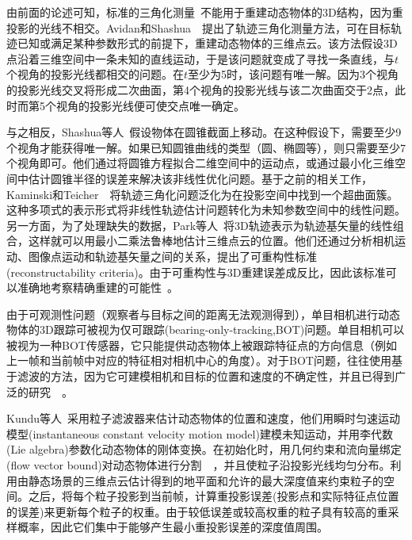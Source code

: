 由前面的论述可知，标准的三角化测量~\cite{hartley1997triangulation}不能用于重建动态物体的3D结构，因为重投影的光线不相交。Avidan和Shashua~\cite{avidan1999trajectory}~\cite{avidan2000trajectory}提出了轨迹三角化测量方法，可在目标轨迹已知或满足某种参数形式的前提下，重建动态物体的三维点云。该方法假设3D点沿着三维空间中一条未知的直线运动，于是该问题就变成了寻找一条直线，与$t$个视角的投影光线都相交的问题。在$t$至少为5时，该问题有唯一解。因为3个视角的投影光线交叉将形成二次曲面，第4个视角的投影光线与该二次曲面交于2点，此时而第5个视角的投影光线便可使交点唯一确定。

与之相反，Shashua等人~\cite{shashua1999trajectory}假设物体在圆锥截面上移动。在这种假设下，需要至少9个视角才能获得唯一解。如果已知圆锥曲线的类型（圆、椭圆等），则只需要至少7个视角即可。他们通过将圆锥方程拟合二维空间中的运动点，或通过最小化三维空间中估计圆锥半径的误差来解决该非线性优化问题。基于之前的相关工作，Kaminski和Teicher~\cite{kaminski2002general}~\cite{kaminski2004general}将轨迹三角化问题泛化为在投影空间中找到一个超曲面簇。这种多项式的表示形式将非线性轨迹估计问题转化为未知参数空间中的线性问题。另一方面，为了处理缺失的数据，Park等人~\cite{park20103d}将3D轨迹表示为轨迹基矢量的线性组合，这样就可以用最小二乘法鲁棒地估计三维点云的位置。他们还通过分析相机运动、图像点运动和轨迹基矢量之间的关系，提出了可重构性标准(reconstructability criteria)。由于可重构性与3D重建误差成反比，因此该标准可以准确地考察精确重建的可能性~\cite{park20153d}。

由于可观测性问题（观察者与目标之间的距离无法观测得到），单目相机进行动态物体的3D跟踪可被视为仅可跟踪(bearing-only-tracking,BOT)问题。单目相机可以被视为一种BOT传感器，它只能提供动态物体上被跟踪特征点的方向信息（例如上一帧和当前帧中对应的特征相对相机中心的角度）。对于BOT问题，往往使用基于滤波的方法，因为它可建模相机和目标的位置和速度的不确定性，并且已得到广泛的研究~\cite{aidala1983utilization}~\cite{le1998bearings}。

Kundu等人~\cite{kundu2011realtime}采用粒子滤波器来估计动态物体的位置和速度，他们用瞬时匀速运动模型(instantaneous constant velocity motion model)建模未知运动，并用李代数(Lie algebra)参数化动态物体的刚体变换。在初始化时，用几何约束和流向量绑定(flow vector bound)对动态物体进行分割~\cite{kundu2009moving}~\cite{kundu2010realtime}，并且使粒子沿投影光线均匀分布。利用由静态场景的三维点云估计得到的地平面和允许的最大深度值来约束粒子的空间。之后，将每个粒子投影到当前帧，计算重投影误差(投影点和实际特征点位置的误差)来更新每个粒子的权重。由于较低误差或较高权重的粒子具有较高的重采样概率，因此它们集中于能够产生最小重投影误差的深度值周围。
